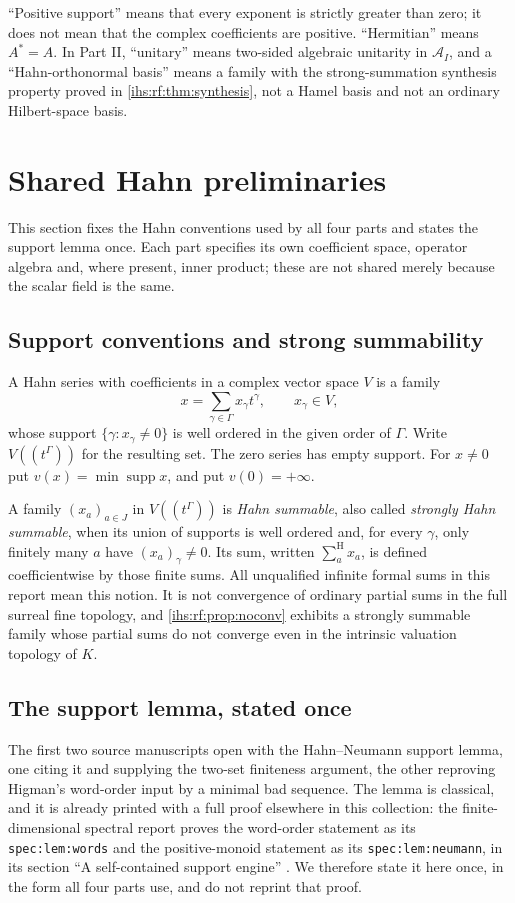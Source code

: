 \documentclass[11pt,a4paper]{article}
\numberwithin{equation}{section}
\theoremstyle{definition}
\theoremstyle{remark}
\newcommand{\K}{K}
\newcommand{\Arf}{\mathcal A_I}
\newcommand{\supp}{\operatorname{supp}}
\newcommand{\sH}{\mathop{\sum}\nolimits^{\mathrm H}}
\begin{document}
``Positive support'' means that every exponent is strictly greater than
zero; it does not mean that the complex coefficients are positive.
``Hermitian'' means $A^*=A$. In Part II, ``unitary'' means two-sided
algebraic unitarity in $\Arf$, and a ``Hahn-orthonormal basis'' means a
family with the strong-summation synthesis property proved in
\cref{ihs:rf:thm:synthesis}, not a Hamel basis and not an ordinary
Hilbert-space basis.

\section{Shared Hahn preliminaries}\label{ihs:sec:prelim}

This section fixes the Hahn conventions used by all four parts and states
the support lemma once. Each part specifies its own coefficient space,
operator algebra and, where present, inner product; these are not shared
merely because the scalar field is the same.

\subsection{Support conventions and strong summability}\label{ihs:sec:supportconv}
A Hahn series with coefficients in a complex vector space $V$ is a family
\[
 x=\sum_{\gamma\in\Gamma}x_\gamma t^\gamma,\qquad x_\gamma\in V,
\]
whose support $\{\gamma:x_\gamma\ne0\}$ is well ordered in the given order
of $\Gamma$. Write $V((t^\Gamma))$ for the resulting set. The zero series has
empty support. For $x\ne0$ put $v(x)=\min\supp x$, and put $v(0)=+\infty$.

A family $(x_a)_{a\in J}$ in $V((t^\Gamma))$ is \emph{Hahn summable}, also
called \emph{strongly Hahn summable}, when its union of supports is well
ordered and, for every $\gamma$, only finitely many $a$ have
$(x_a)_\gamma\ne0$. Its sum, written $\sH_a x_a$, is defined coefficientwise
by those finite sums. All unqualified infinite formal sums in this report
mean this notion. It is not convergence of ordinary partial sums in the full
surreal fine topology, and \cref{ihs:rf:prop:noconv} exhibits a strongly
summable family whose partial sums do not converge even in the intrinsic
valuation topology of $\K$.

\subsection{The support lemma, stated once}\label{ihs:sec:supportlemma}
The first two source manuscripts open with the Hahn--Neumann support lemma, one
citing it and supplying the two-set finiteness argument, the other
reproving Higman's word-order input by a minimal bad sequence. The lemma is
classical, and it is already printed with a full proof elsewhere in this
collection: the finite-dimensional spectral report proves the word-order
statement as its \texttt{spec:lem:words} and the positive-monoid statement
as its \texttt{spec:lem:neumann}, in its section ``A self-contained support
engine'' \cite{RepoSpectral}. We therefore state it here once, in the form
all four parts use, and do not reprint that proof.
\end{document}
